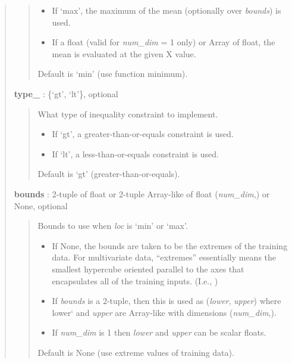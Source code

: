 \documentclass[letterpaper,10pt,english]{sphinxmanual}
\begin{document}
\begin{fulllineitems}
\begin{quote}
\begin{description}
\begin{quote}
\begin{itemize}
\item {} 
If `max', the maximum of the mean (optionally over \emph{bounds}) is used.

\item {} 
If a float (valid for \emph{num\_dim} = 1 only) or Array of float, the mean
is evaluated at the given X value.

\end{itemize}

Default is `min' (use function minimum).
\end{quote}

\textbf{type\_} : \{`gt', `lt'\}, optional
\begin{quote}

What type of inequality constraint to implement.
\begin{itemize}
\item {} 
If `gt', a greater-than-or-equals constraint is used.

\item {} 
If `lt', a less-than-or-equals constraint is used.

\end{itemize}

Default is `gt' (greater-than-or-equals).
\end{quote}

\textbf{bounds} : 2-tuple of float or 2-tuple Array-like of float (\emph{num\_dim},) or None, optional
\begin{quote}

Bounds to use when \emph{loc} is `min' or `max'.
\begin{itemize}
\item {} 
If None, the bounds are taken to be the extremes of the training data.
For multivariate data, ``extremes'' essentially means the smallest
hypercube oriented parallel to the axes that encapsulates all of the
training inputs. (I.e., )

\item {} 
If \emph{bounds} is a 2-tuple, then this is used as (\emph{lower}, \emph{upper})
where lower{}` and \emph{upper} are Array-like with dimensions (\emph{num\_dim},).

\item {} 
If \emph{num\_dim} is 1 then \emph{lower} and \emph{upper} can be scalar floats.

\end{itemize}

Default is None (use extreme values of training data).
\end{quote}


\end{description}
\end{quote}
\end{fulllineitems}
\end{document}
